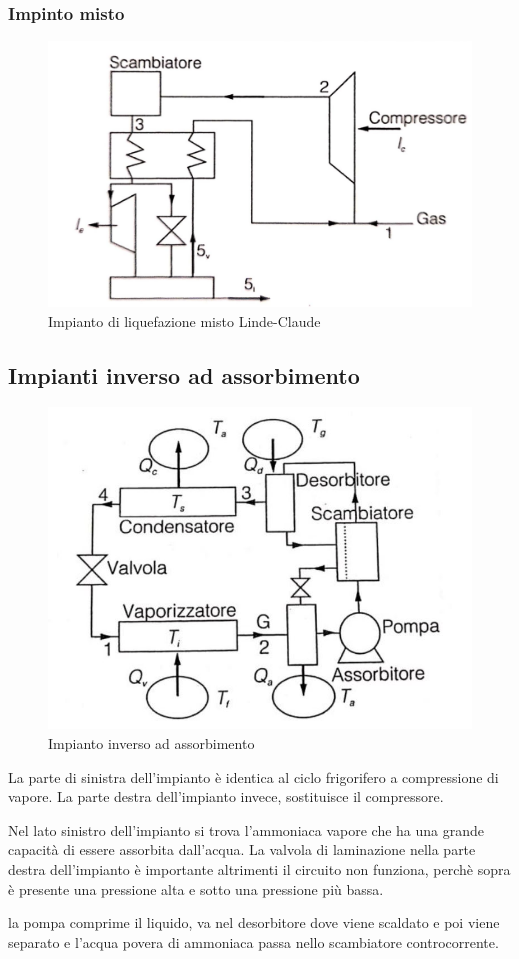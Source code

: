 \documentclass[a4paper]{article}
\numberwithin{equation}{section}%
\begin{document}
\subsubsection{Impinto misto}
\begin{figure}[H]
	\begin{center}
		\includegraphics[width=0.4\columnwidth]{Impiantomisto.jpg}
	\end{center}
	\caption{Impianto di liquefazione misto Linde-Claude}
\end{figure}

\subsection{Impianti inverso ad assorbimento}
\begin{figure}[H]
	\begin{center}
		\includegraphics[width=0.4\columnwidth]{impiantoinversoadassorbimento.jpg}
	\end{center}
	\caption{Impianto inverso ad assorbimento}
\end{figure}

La parte di sinistra dell'impianto è identica al ciclo frigorifero a compressione di vapore. La parte destra dell'impianto invece, sostituisce il compressore.

Nel lato sinistro dell'impianto si trova l'ammoniaca vapore che ha una grande capacità di essere assorbita dall'acqua. 
La valvola di laminazione nella parte destra dell'impianto è importante altrimenti il circuito non funziona, perchè sopra è presente una pressione alta e sotto una pressione più bassa.

la pompa comprime il liquido, va nel desorbitore dove viene scaldato e poi viene separato e l'acqua povera di ammoniaca passa nello scambiatore controcorrente.
\end{document}
